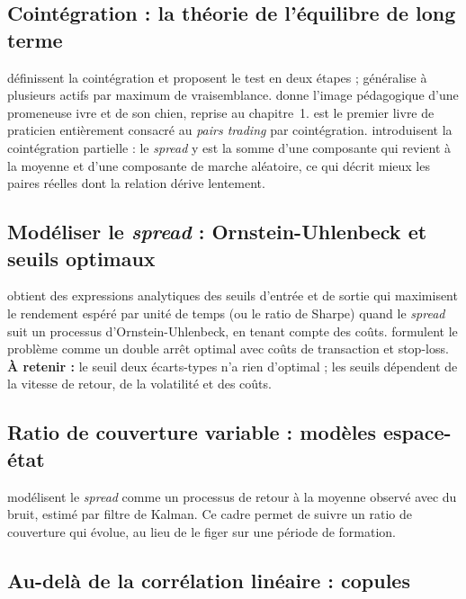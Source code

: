 \documentclass[11pt,a4paper]{article}
\begin{document}
\subsection{Cointégration : la théorie de l'équilibre de long terme}

\citet{englegranger1987} définissent la cointégration et proposent le test en deux étapes ; \citet{johansen1991} généralise à plusieurs actifs par maximum de vraisemblance. \citet{murray1994} donne l'image pédagogique d'une promeneuse ivre et de son chien, reprise au chapitre~1. \citet{vidyamurthy2004} est le premier livre de praticien entièrement consacré au \emph{pairs trading} par cointégration. \citet{clegg2018} introduisent la cointégration partielle : le \emph{spread} y est la somme d'une composante qui revient à la moyenne et d'une composante de marche aléatoire, ce qui décrit mieux les paires réelles dont la relation dérive lentement.

\subsection{Modéliser le \emph{spread} : Ornstein-Uhlenbeck et seuils optimaux}

\citet{bertram2010} obtient des expressions analytiques des seuils d'entrée et de sortie qui maximisent le rendement espéré par unité de temps (ou le ratio de Sharpe) quand le \emph{spread} suit un processus d'Ornstein-Uhlenbeck, en tenant compte des coûts. \citet{leungli2015} formulent le problème comme un double arrêt optimal avec coûts de transaction et stop-loss. \textbf{À retenir :} le seuil \og deux écarts-types\fg{} n'a rien d'optimal ; les seuils dépendent de la vitesse de retour, de la volatilité et des coûts.

\subsection{Ratio de couverture variable : modèles espace-état}

\citet{elliott2005} modélisent le \emph{spread} comme un processus de retour à la moyenne observé avec du bruit, estimé par filtre de Kalman. Ce cadre permet de suivre un ratio de couverture qui évolue, au lieu de le figer sur une période de formation.

\subsection{Au-delà de la corrélation linéaire : copules}
\end{document}
